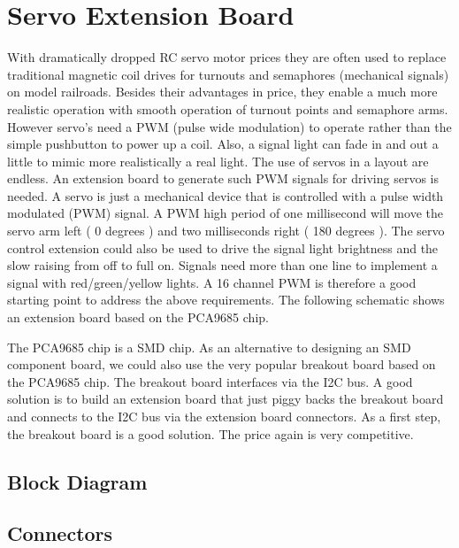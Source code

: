 \chapter{Servo Extension Board}

With dramatically dropped RC servo motor prices they are often used to replace traditional magnetic coil drives for turnouts and semaphores (mechanical signals) on model railroads. Besides their advantages in price, they enable a much more realistic operation with smooth operation of turnout points and semaphore arms. However servo’s need a PWM (pulse wide modulation) to operate rather than the simple pushbutton to power up a coil. Also, a signal light can fade in and out a little to mimic more realistically a real light. The use of servos in a layout are endless. An extension board to generate such PWM signals for driving servos is needed. A servo is just a mechanical device that is controlled with a pulse width modulated (PWM) signal. A PWM high period of one millisecond will move the servo arm left ( 0 degrees ) and two milliseconds right ( 180 degrees ). The servo control extension could also be used to drive the signal light brightness and the slow raising from off to full on. Signals need more than one line to implement a signal with red/green/yellow lights. A 16 channel PWM is therefore a good starting point to address the above requirements. The following schematic shows an extension board based on the PCA9685 chip.

The PCA9685 chip is a SMD chip. As an alternative to designing an SMD component board, we could also use the very popular breakout board based on the PCA9685 chip. The breakout board interfaces via the I2C bus. A good solution is to build an extension board that just piggy backs the breakout board and connects to the I2C bus via the extension board connectors. As a first step, the breakout board is a good solution. The price again is very competitive.

\section{Block Diagram}


\section{Connectors}

